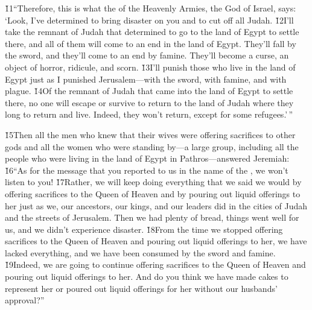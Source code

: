 \v{11}``Therefore, this is what the  of the Heavenly Armies, the God of Israel, says: `Look, I've determined to bring disaster on you and to cut off all Judah. \v{12}I'll take the remnant of Judah that determined to go to the land of Egypt to settle there, and all of them will come to an end in the land of Egypt. They'll fall by the sword, and they'll come to an end by famine. They'll become a curse, an object of horror, ridicule, and scorn. \v{13}I'll punish those who live in the land of Egypt just as I punished Jerusalem---with the sword, with famine, and with plague. \v{14}Of the remnant of Judah that came into the land of Egypt to settle there, no one will escape or survive to return to the land of Judah where they long to return and live. Indeed, they won't return, except for some refugees.'\,''

\v{15}Then all the men who knew that their wives were offering sacrifices to other gods and all the women who were standing by---a large group, including all the people who were living in the land of Egypt in Pathros---answered Jeremiah: \v{16}``As for the message that you reported to us in the name of the , we won't listen to you! \v{17}Rather, we will keep doing everything that we said we would by offering sacrifices to the Queen of Heaven and by pouring out liquid offerings to her just as we, our ancestors, our kings, and our leaders did in the cities of Judah and the streets of Jerusalem. Then we had plenty of bread, things went well for us, and we didn't experience disaster. \v{18}From the time we stopped offering sacrifices to the Queen of Heaven and pouring out liquid offerings to her, we have lacked everything, and we have been consumed by the sword and famine. \v{19}Indeed, we are going to continue offering sacrifices to the Queen of Heaven and pouring out liquid offerings to her. And do you think we have made cakes to represent her or poured out liquid offerings for her without our husbands' approval?''

